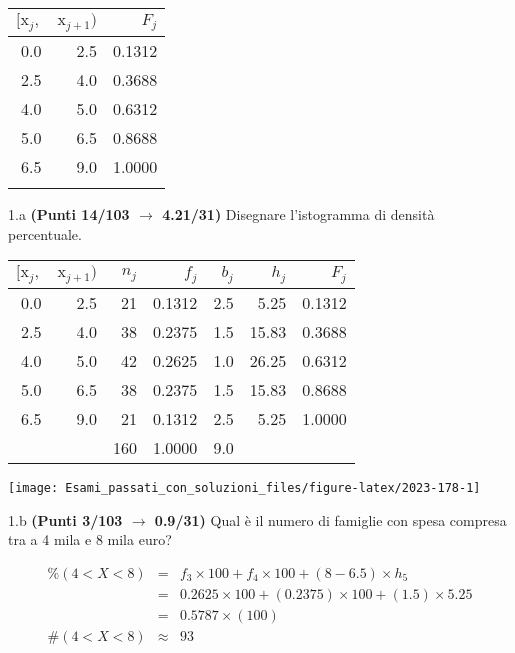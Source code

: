 \documentclass[
  11pt,
]{book}
\theoremstyle{mytheoremstyle}
\theoremstyle{mydefstyle}
\newenvironment{sol}
  {
  \begin{tcolorbox}[enhanced,breakable,arc=0.1mm,boxrule=1pt,colback=white,colframe=iblue,
  title=\bf \fontfamily{lmss}\selectfont \hspace{.5 cm} Soluzione,drop fuzzy shadow]

}{
\end{tcolorbox}
  }
\begin{document}
\begin{table}[H]
\centering
\begin{tabular}{rrr}
\toprule
$[\text{x}_j,$ & $\text{x}_{j+1})$ & $F_j$\\
\midrule
0.0 & 2.5 & 0.1312\\
2.5 & 4.0 & 0.3688\\
4.0 & 5.0 & 0.6312\\
5.0 & 6.5 & 0.8688\\
6.5 & 9.0 & 1.0000\\
 &  & \\
\bottomrule
\end{tabular}
\end{table}

1.a \textbf{(Punti 14/103 \(\rightarrow\) 4.21/31)} Disegnare l'istogramma di densità percentuale.

\begin{sol}

\begin{table}[H]
\centering
\begin{tabular}{rrrrrrr}
\toprule
$[\text{x}_j,$ & $\text{x}_{j+1})$ & $n_j$ & $f_j$ & $b_j$ & $h_j$ & $F_j$\\
\midrule
0.0 & 2.5 & 21 & 0.1312 & 2.5 & 5.25 & 0.1312\\
2.5 & 4.0 & 38 & 0.2375 & 1.5 & 15.83 & 0.3688\\
4.0 & 5.0 & 42 & 0.2625 & 1.0 & 26.25 & 0.6312\\
5.0 & 6.5 & 38 & 0.2375 & 1.5 & 15.83 & 0.8688\\
6.5 & 9.0 & 21 & 0.1312 & 2.5 & 5.25 & 1.0000\\
 &  & 160 & 1.0000 & 9.0 &  & \\
\bottomrule
\end{tabular}
\end{table}

\begin{center}\texttt{[image: Esami\_passati\_con\_soluzioni\_files/figure-latex/2023-178-1]} \end{center}

\end{sol}

1.b \textbf{(Punti 3/103 \(\rightarrow\) 0.9/31)} Qual è il numero di famiglie con spesa compresa tra a 4 mila e 8 mila euro?

\begin{sol}
\begin{eqnarray*} \%(4<X<8) &=&  f_{3}\times 100+ f_{ 4 }\times 100 + (8-6.5)\times h_{5}  \\ 
 &=&0.2625\times 100 + ( 0.2375 )\times 100 + (1.5)\times 5.25  \\ 
 &=&  0.5787 \times(100)\\
     \#( 4 < X < 8 ) &\approx& 93 
         \end{eqnarray*}

\end{sol}
\end{document}
